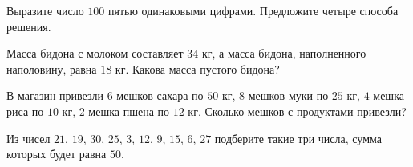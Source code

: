 \begin{consultation}
\begin{listofex}
		\item Выразите число \( 100 \) пятью одинаковыми цифрами. Предложите четыре способа решения.
		\item Масса бидона с молоком составляет \( 34 \) кг, а масса бидона, наполненного наполовину, равна \( 18 \) кг. Какова масса пустого бидона?
		\item В магазин привезли \( 6 \) мешков сахара по \( 50 \) кг, \( 8 \) мешков муки по \( 25 \) кг, \( 4 \) мешка риса по \( 10  \) кг, \( 2 \) мешка пшена по \( 12 \) кг. Сколько мешков с продуктами привезли? 
		\item Из чисел \( 21 \), \( 19 \), \( 30 \), \( 25 \), \( 3 \), \( 12 \), \( 9 \), \( 15 \), \( 6 \), \( 27  \) подберите такие три числа, сумма которых будет равна \( 50 \).
	\end{listofex}
\end{consultation}
